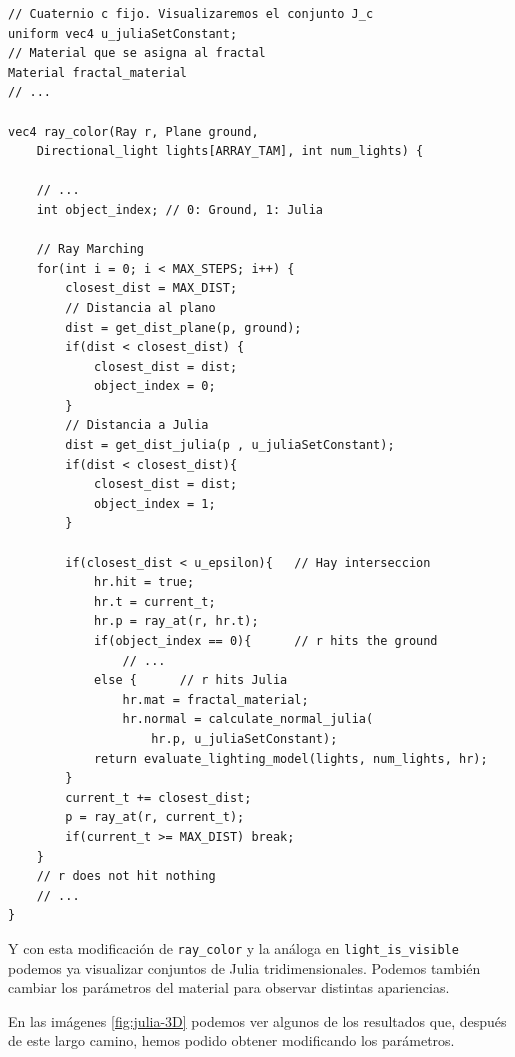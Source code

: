 \begin{lstlisting}
// Cuaternio c fijo. Visualizaremos el conjunto J_c
uniform vec4 u_juliaSetConstant;
// Material que se asigna al fractal
Material fractal_material
// ...

vec4 ray_color(Ray r, Plane ground, 
    Directional_light lights[ARRAY_TAM], int num_lights) {

    // ... 
    int object_index; // 0: Ground, 1: Julia

    // Ray Marching
    for(int i = 0; i < MAX_STEPS; i++) {
        closest_dist = MAX_DIST;
        // Distancia al plano
        dist = get_dist_plane(p, ground);
        if(dist < closest_dist) {
            closest_dist = dist;
            object_index = 0;
        }
        // Distancia a Julia
        dist = get_dist_julia(p , u_juliaSetConstant);
        if(dist < closest_dist){
            closest_dist = dist;
            object_index = 1;
        }

        if(closest_dist < u_epsilon){   // Hay interseccion
            hr.hit = true;
            hr.t = current_t;
            hr.p = ray_at(r, hr.t);
            if(object_index == 0){      // r hits the ground
                // ... 
            else {      // r hits Julia
                hr.mat = fractal_material;
                hr.normal = calculate_normal_julia(
                    hr.p, u_juliaSetConstant);
            return evaluate_lighting_model(lights, num_lights, hr);
        }
        current_t += closest_dist;
        p = ray_at(r, current_t);
        if(current_t >= MAX_DIST) break;
    }
    // r does not hit nothing
    // ... 
}
\end{lstlisting}

Y con esta modificación de \verb|ray_color| y la análoga en \verb|light_is_visible| podemos ya visualizar conjuntos de Julia tridimensionales. Podemos también cambiar los parámetros del material para observar distintas apariencias. 

En las imágenes \ref{fig:julia-3D} podemos ver algunos de los resultados que, después de este largo camino, hemos podido obtener modificando los parámetros.


